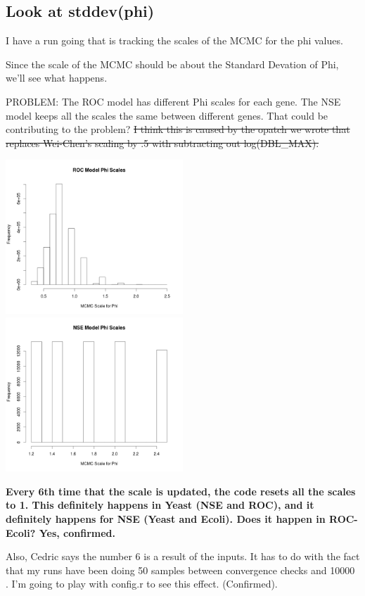 \subsection{Look at stddev(phi)}

I have a run going that is tracking the scales of the MCMC for the phi values.

Since the scale of the MCMC should be about the Standard Devation of Phi, we'll see what happens.

PROBLEM:
The ROC model has different Phi scales for each gene. The NSE model keeps all the scales the same between different genes. That could be contributing to the problem? \sout{I think this is caused by the opatch we wrote that replaces Wei-Chen's scaling by .5  with subtracting out log(DBL\_MAX).}

\includegraphics[width=0.5\textwidth]{data/oct10-roc-scalehist.png}
\includegraphics[width=0.5\textwidth]{data/oct10-nse-scalehist.png}

\textbf{Every 6th time that the scale is updated, the code resets all the scales to 1. This definitely happens in Yeast (NSE and ROC), and it definitely happens for NSE (Yeast and Ecoli). Does it happen in ROC-Ecoli? Yes, confirmed.}

Also, Cedric says the number 6 is a result of the inputs. It has to do with the fact that my runs have been doing 50 samples between convergence checks and 10000 . I'm going to play with config.r to see this effect. (Confirmed).

